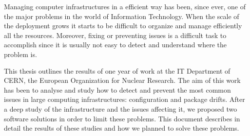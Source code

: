 
Managing computer infrastructures in a efficient way has been, since ever,
one of the major problems in the world of Information Technology. When the
scale of the deployment grows it starts to be difficult to organize and
manage efficiently all the resources. Moreover, fixing or preventing
issues is a difficult task to accomplish since it is usually not easy to
detect and understand where the problem is.

This thesis outlines the results of one year of work at the IT Department
of CERN, the European Organization for Nuclear Research. The aim of this
work has been to analyse and study how to detect and prevent the most
common issues in large computing infrastructures: configuration and
package drifts. After a deep study of the infrastructure and the issues
affecting it, we proposed two software solutions in order to limit these
problems. This document describes in detail the results of these studies
and how we planned to solve these problems.

